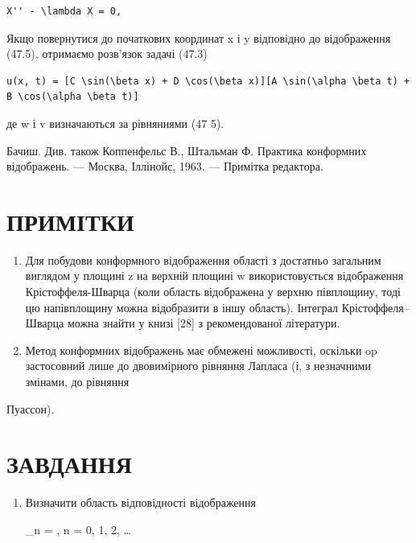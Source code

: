 \documentclass[
  ukrainian,
]{article}
\begin{document}
\begin{verbatim}
X'' - \lambda X = 0,
\end{verbatim}

Якщо повернутися до початкових координат x і y відповідно до
відображення (47.5), отримаємо розв'язок задачі (47.3)

\begin{verbatim}
u(x, t) = [C \sin(\beta x) + D \cos(\beta x)][A \sin(\alpha \beta t) + B \cos(\alpha \beta t)]
\end{verbatim}

де w і v визначаються за рівняннями (47 5).

Бачиш. Див. також Коппенфельс В., Штальман Ф. Практика конформних
відображень. --- Москва, Іллінойс, 1963. --- Примітка редактора.

\section{ПРИМІТКИ}\label{ux43fux440ux438ux43cux456ux442ux43aux438}

\begin{enumerate}
\def\labelenumi{\arabic{enumi}.}
\item
  Для побудови конформного відображення області з достатньо загальним
  виглядом у площині z на верхній площині w використовується
  відображення Крістоффеля-Шварца (коли область відображена у верхню
  півплощину, тоді цю напівплощину можна відобразити в іншу область).
  Інтеграл Крістоффеля--Шварца можна знайти у книзі {[}28{]} з
  рекомендованої літератури.
\item
  Метод конформних відображень має обмежені можливості, оскільки op
  застосовний лише до двовимірного рівняння Лапласа (і, з незначними
  змінами, до рівняння
\end{enumerate}

Пуассон).

\section{ЗАВДАННЯ}\label{ux437ux430ux432ux434ux430ux43dux43dux44f-3}

\begin{enumerate}
\def\labelenumi{\arabic{enumi}.}
\item
  Визначити область відповідності відображення

  \beta\_n = , \quad n = 0, 1, 2, \ldots
\end{enumerate}
\end{document}

